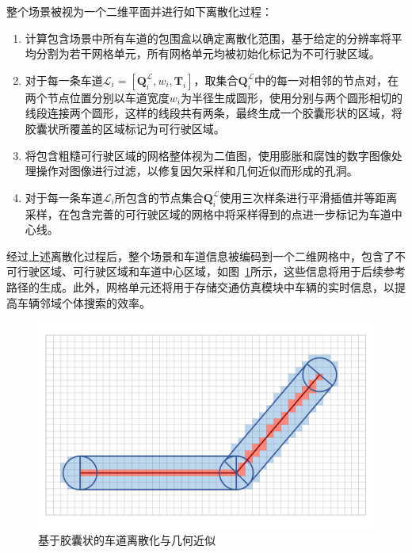 整个场景被视为一个二维平面并进行如下离散化过程：
\begin{enumerate}
    \item 计算包含场景中所有车道的包围盒以确定离散化范围，基于给定的分辨率将平均分割为若干网格单元，所有网格单元均被初始化标记为不可行驶区域。

    \item 对于每一条车道$\mathscr{L}_i = [\textbf{Q}^{\mathscr{L}}_{i}, w_i, \textbf{T}_{i}]$，取集合$\textbf{Q}^{\mathscr{L}}_{i}$中的每一对相邻的节点对，在两个节点位置分别以车道宽度$w_i$为半径生成圆形，使用分别与两个圆形相切的线段连接两个圆形，这样的线段共有两条，最终生成一个胶囊形状的区域，将胶囊状所覆盖的区域标记为可行驶区域。

    \item 将包含粗糙可行驶区域的网格整体视为二值图，使用膨胀和腐蚀的数字图像处理操作对图像进行过滤，以修复因欠采样和几何近似而形成的孔洞。

    \item 对于每一条车道$\mathscr{L}_i$所包含的节点集合$\textbf{Q}^{\mathscr{L}}_{i}$使用三次样条进行平滑插值并等距离采样，在包含完善的可行驶区域的网格中将采样得到的点进一步标记为车道中心线。
\end{enumerate}

经过上述离散化过程后，整个场景和车道信息被编码到一个二维网格中，包含了不可行驶区域、可行驶区域和车道中心区域，如图~\ref{fig:traedits_laneapproximate}所示，这些信息将用于后续参考路径的生成。此外，网格单元还将用于存储交通仿真模块中车辆的实时信息，以提高车辆邻域个体搜索的效率。

\begin{figure}[!tbh]
\centering
\includegraphics[width=0.9\columnwidth]{figure/traedits/lane approximation.pdf}
\caption[基于胶囊状的车道离散化与几何近似]{
基于胶囊状的车道离散化与几何近似
}
\label{fig:traedits_laneapproximate}
\end{figure}




